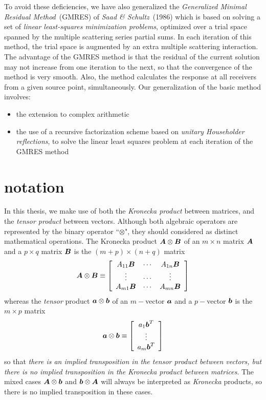 To avoid these deficiencies, we have also generalized the {\em 
Generalized Minimal Residual Method\/}~(GMRES) of {\em Saad \& 
Schultz\/}~(1986) which is based on solving a set of {\em linear least-squares 
minimization problems\/}, optimized over a trial space spanned by the multiple 
scattering series partial sums. In each iteration of this method, the 
trial space is augmented by an extra multiple scattering interaction. The 
advantage of the  GMRES method is that the residual of the current solution may not increase 
from one iteration to the next, so that the convergence of the method is 
very smooth. Also, the method calculates the response at all 
receivers from a given source point, simultaneously. Our generalization 
of the basic method involves:
\begin{itemize}
\item the extension to complex arithmetic
\item the use of a recursive factorization scheme based on {\em unitary 
Householder reflections\/}, to solve the linear least squares problem at 
each iteration of the GMRES method
\end{itemize}



\section{notation}
In this thesis, we make use of both the {\em Kronecka product\/} between 
matrices, and the {\em tensor product\/} between vectors. Although both algebraic 
operators are represented by the binary operator ``$\otimes$", they 
should considered as distinct mathematical operations.
The  Kronecka product ${\mbox{\boldmath$\mit A$\unboldmath}} \otimes {\mbox{\boldmath$\mit B$\unboldmath}}$  of an $m \times n$ matrix $\mbox{\boldmath$\mit A$\unboldmath}$ and a 
$p \times q$  matrix ${\mbox{\boldmath$\mit B$\unboldmath}}$ is the $(m+p) \times (n+q)$ matrix
\[
{\mbox{\boldmath$\mit A$\unboldmath}} \otimes {\mbox{\boldmath$\mit B$\unboldmath}} \equiv \left[{\begin{array}{ccc}{ 
A}_{ 11}{\mbox{\boldmath$\mit B$\unboldmath}}&\cdots &{ A}_{1n}{\mbox{\boldmath$\mit B$\unboldmath}}\\ \vdots&\cdots &\vdots\\ 
{A}_{m1}{\mbox{\boldmath$\mit B$\unboldmath}}&\cdots &{A}_{mn}{\mbox{\boldmath$\mit B$\unboldmath}}\end{array}}\right]
\] 
whereas the {\em tensor\/} product ${\mbox{\boldmath$\mit a$\unboldmath}} \otimes {\mbox{\boldmath$\mit b$\unboldmath}}$
of an $m-$vector $\mbox{\boldmath$\mit a$\unboldmath}$ and a 
$p-$vector ${\mbox{\boldmath$\mit b$\unboldmath}}$ is the $m \times p$ matrix
\[
{\mbox{\boldmath$\mit a$\unboldmath}} \otimes {\mbox{\boldmath$\mit b$\unboldmath}} \equiv \left[{\begin{array}{c}{ 
a}_{ 1}{\mbox{\boldmath$\mit b$\unboldmath}}^{T}\\ \vdots\\ 
{a}_{m}{\mbox{\boldmath$\mit b$\unboldmath}}^{T}\end{array}}\right]
\] 
so that {\em there is an implied transposition in the tensor product between 
vectors, but there is no implied transposition in the Kronecka product 
between matrices\/}. The mixed cases ${\mbox{\boldmath$\mit A$\unboldmath}} \otimes {\mbox{\boldmath$\mit b$\unboldmath}}$ and  
${\mbox{\boldmath$\mit b$\unboldmath}} \otimes {\mbox{\boldmath$\mit A$\unboldmath}} $ will always be interpreted as {\em 
Kronecka\/} products, so there is no implied transposition in these cases.


